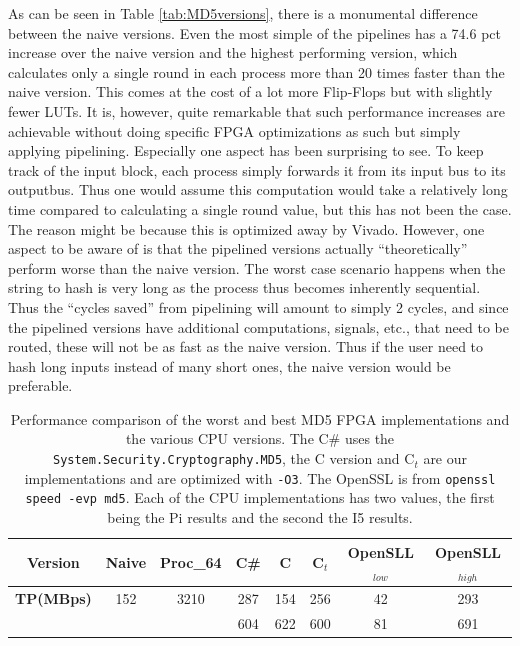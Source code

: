 \documentclass[a4paper, openany]{book}
\begin{document}
\begin{abstact}
As can be seen in Table \ref{tab:MD5versions}, there is a monumental difference between the naive versions. Even the most simple of the pipelines has a 74.6 pct increase over the naive version and the highest performing version, which calculates only a single round in each process more than 20 times faster than the naive version. This comes at the cost of a lot more Flip-Flops but with slightly fewer LUTs. It is, however, quite remarkable that such performance increases are achievable without doing specific FPGA optimizations as such but simply applying pipelining. Especially one aspect has been surprising to see. To keep track of the input block, each process simply forwards it from its input bus to its outputbus. Thus one would assume this computation would take a relatively long time compared to calculating a single round value, but this has not been the case. The reason might be because this is optimized away by Vivado. However, one aspect to be aware of is that the pipelined versions actually ``theoretically'' perform worse than the naive version. The worst case scenario happens when the string to hash is very long as the process thus becomes inherently sequential. Thus the ``cycles saved'' from pipelining will amount to simply 2 cycles, and since the pipelined versions have additional computations, signals, etc., that need to be routed, these will not be as fast as the naive version. Thus if the user need to hash long inputs instead of many short ones, the naive version would be preferable.
\begin{table}[!htb]
\centering
\captionsetup{width=.8\linewidth}
\begin{tabular}{c c c c c c c c}
\hline
\textbf{Version} & Naive & Proc_{64} & C\# & C & C$_{t}$ & OpenSLL$_{low}$ & OpenSLL$_{high}$\\
\hline
\textbf{TP(MBps)} & 152 & 3210 & 287 & 154 & 256 & 42 & 293\\
 & & & 604 & 622 & 600 & 81 & 691
\end{tabular}
\caption[MD5: FPGA and CPU comparisons]%
{Performance comparison of the worst and best MD5 FPGA implementations and the various CPU versions. The C\# uses the \texttt{System.Security.Cryptography.MD5}, the C version and C$_t$ are our implementations and are optimized with \texttt{-O3}. The OpenSSL is from \texttt{openssl speed -evp md5}. Each of the CPU implementations has two values, the first being the Pi results and the second the I5 results.}
\label{tab:MD5compare}
\end{table}

\end{abstact}
\end{document}
